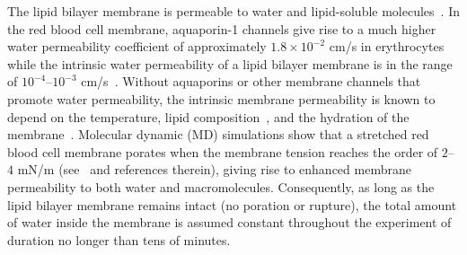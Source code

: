 \documentclass[prb,preprint,showpacs,preprintnumbers,amsmath,amssymb,longbibliography]{revtex4-1}
\begin{document}
The lipid bilayer membrane is permeable to water and lipid-soluble
molecules~\cite{Dick1964_JTB, FettiplaceHaydon1980_PhysRev,
DeamerBramhall1986_ChemPhysLipids, Grafmueller2019_ABLS}. 
%
%
In the red blood cell membrane, aquaporin-1 channels give rise to a much
higher water permeability coefficient of approximately $1.8\times 10^{-2}$ cm/s in
erythrocytes~\cite{YangMaVerkman2001_JBC} while the intrinsic water
permeability of a lipid bilayer membrane is in the range of
$10^{-4}$--$10^{-3}$ cm/s~\cite{ThompsonHuang1966_ANYAS,
FettiplaceHaydon1980_PhysRev, Grafmueller2019_ABLS, Dimova2020_GVB,
BhatiaRobinsonDimova2020_SoftMatt}. 
Without aquaporins or other membrane channels that promote water
permeability, the intrinsic membrane permeability is known to depend on the
temperature, lipid composition~\cite{OlbrichRawiczNeedhamEtAl2000_BJ},
and the hydration of the membrane~\cite{MarrinkBerendsen1994_JPhysChem}.
%
Molecular dynamic (MD) simulations show that a stretched red blood cell
membrane porates when the membrane tension reaches the order of $2$--$4$
mN/m (see~\citet{RazizadehNikfarPaulLiu2020_BJ} and references therein),
giving rise to enhanced membrane permeability to both water and
macromolecules. Consequently, as long as the lipid bilayer membrane
remains intact (no poration or rupture), the total amount of water inside the membrane 
is assumed constant throughout the experiment of duration
no longer than tens of minutes.
%
\end{document}
